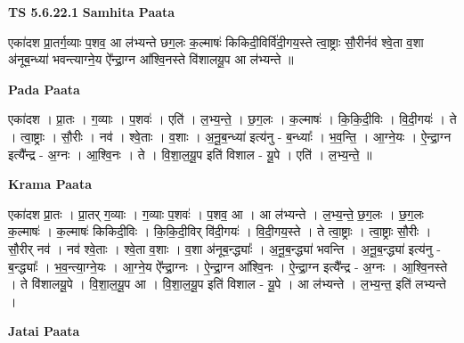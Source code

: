 \documentclass[17pt]{extarticle}
\begin{document}
\textbf{TS 5.6.22.1 } \newline
\textbf{Samhita Paata} \newline

एका॑दश प्रा॒तर्ग॒व्याः प॒शव॒ आ ल॑भ्यन्ते छग॒लः क॒ल्माषः॑ किकिदी॒विर्वि॑दी॒गय॒स्ते त्वा॒ष्ट्राः सौ॒रीर्नव॑ श्वे॒ता व॒शा अ॑नूब॒न्ध्या॑ भवन्त्याग्ने॒य ऐ᳚न्द्रा॒ग्न आ᳚श्वि॒नस्ते वि॑शालयू॒प आ ल॑भ्यन्ते ॥ \newline

\textbf{Pada Paata} \newline

एका॑दश । प्रा॒तः । ग॒व्याः । प॒शवः॑ । एति॑ । ल॒भ्य॒न्ते॒ । छ॒ग॒लः । क॒ल्माषः॑ । कि॒कि॒दी॒विः । वि॒दी॒गयः॑ । ते । त्वा॒ष्ट्राः । सौ॒रीः । नव॑ । श्वे॒ताः । व॒शाः । अ॒नू॒ब॒न्ध्या॑ इत्य॑नु - ब॒न्ध्याः᳚ । भ॒व॒न्ति॒ । आ॒ग्ने॒यः । ऐ॒न्द्रा॒ग्न इत्यै᳚न्द्र - अ॒ग्नः । आ॒श्वि॒नः । ते । वि॒शा॒ल॒यू॒प इति॑ विशाल - यू॒पे । एति॑ । ल॒भ्य॒न्ते॒ ॥  \newline


\textbf{Krama Paata} \newline

एका॑दश प्रा॒तः । प्रा॒तर् ग॒व्याः । ग॒व्याः प॒शवः॑ । प॒शव॒ आ । आ ल॑भ्यन्ते । ल॒भ्य॒न्ते॒ छ॒ग॒लः । छ॒ग॒लः क॒ल्माषः॑ । क॒ल्माषः॑ किकिदी॒विः । कि॒कि॒दी॒विर् वि॑दी॒गयः॑ । वि॒दी॒गय॒स्ते । ते त्वा॒ष्ट्राः । त्वा॒ष्ट्राः सौ॒रीः । सौ॒रीर् नव॑ । नव॑ श्वे॒ताः । श्वे॒ता व॒शाः । व॒शा अ॑नूब॒न्द्ध्याः᳚ । अ॒नू॒ब॒न्द्ध्या॑ भवन्ति । अ॒नू॒ब॒न्द्ध्या॑ इत्य॑नु - ब॒न्द्ध्याः᳚ । भ॒व॒न्त्या॒ग्ने॒यः । आ॒ग्ने॒य ऐ᳚न्द्रा॒ग्नः । ऐ॒न्द्रा॒ग्न आ᳚श्वि॒नः । ऐ॒न्द्रा॒ग्न इत्यै᳚न्द्र - अ॒ग्नः । आ॒श्वि॒नस्ते । ते वि॑शालयू॒पे । वि॒शा॒ल॒यू॒प आ । वि॒शा॒ल॒यू॒प इति॑ विशाल - यू॒पे । आ ल॑भ्यन्ते । ल॒भ्य॒न्त॒ इति॑ लभ्यन्ते । \newline

\textbf{Jatai Paata} \newline
\end{document}
